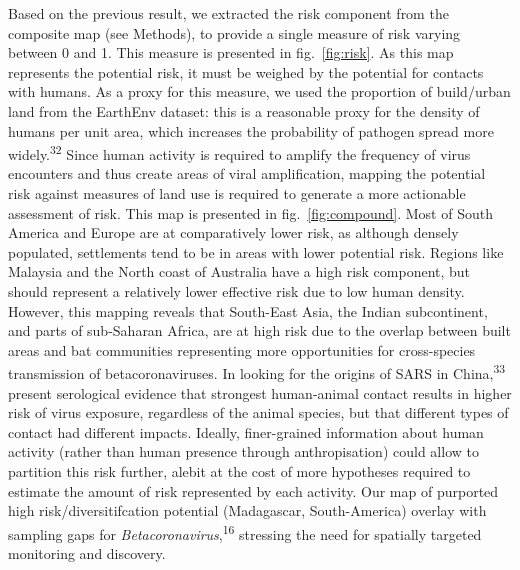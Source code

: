 \documentclass[11pt]{article}
\begin{document}
Based on the previous result, we extracted the risk component from the
composite map (see Methods), to provide a single measure of risk varying
between 0 and 1. This measure is presented in fig.~\ref{fig:risk}. As
this map represents the potential risk, it must be weighed by the
potential for contacts with humans. As a proxy for this measure, we used
the proportion of build/urban land from the EarthEnv dataset: this is a
reasonable proxy for the density of humans per unit area, which
increases the probability of pathogen spread more
widely.\textsuperscript{32} Since human activity is required to amplify
the frequency of virus encounters and thus create areas of viral
amplification, mapping the potential risk against measures of land use
is required to generate a more actionable assessment of risk. This map
is presented in fig.~\ref{fig:compound}. Most of South America and
Europe are at comparatively lower risk, as although densely populated,
settlements tend to be in areas with lower potential risk. Regions like
Malaysia and the North coast of Australia have a high risk component,
but should represent a relatively lower effective risk due to low human
density. However, this mapping reveals that South-East Asia, the Indian
subcontinent, and parts of sub-Saharan Africa, are at high risk due to
the overlap between built areas and bat communities representing more
opportunities for cross-species transmission of betacoronaviruses. In
looking for the origins of SARS in China,\textsuperscript{33} present
serological evidence that strongest human-animal contact results in
higher risk of virus exposure, regardless of the animal species, but
that different types of contact had different impacts. Ideally,
finer-grained information about human activity (rather than human
presence through anthropisation) could allow to partition this risk
further, alebit at the cost of more hypotheses required to estimate the
amount of risk represented by each activity. Our map of purported high
risk/diversitifcation potential (Madagascar, South-America) overlay with
sampling gaps for \emph{Betacoronavirus},\textsuperscript{16} stressing
the need for spatially targeted monitoring and discovery.
\end{document}
